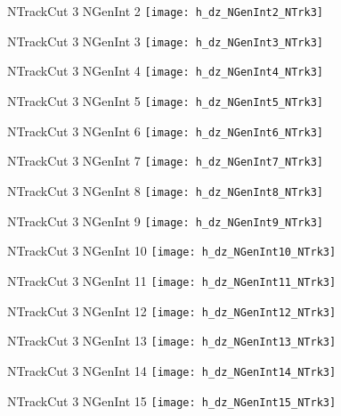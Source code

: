 \documentclass[8pt]{beamer}
\begin{document}
\begin{frame}
\center
\large{NTrackCut 3 NGenInt 2}
\texttt{[image: h\_dz\_NGenInt2\_NTrk3]}
\end{frame}
\begin{frame}
\center
\large{NTrackCut 3 NGenInt 3}
\texttt{[image: h\_dz\_NGenInt3\_NTrk3]}
\end{frame}
\begin{frame}
\center
\large{NTrackCut 3 NGenInt 4}
\texttt{[image: h\_dz\_NGenInt4\_NTrk3]}
\end{frame}
\begin{frame}
\center
\large{NTrackCut 3 NGenInt 5}
\texttt{[image: h\_dz\_NGenInt5\_NTrk3]}
\end{frame}
\begin{frame}
\center
\large{NTrackCut 3 NGenInt 6}
\texttt{[image: h\_dz\_NGenInt6\_NTrk3]}
\end{frame}
\begin{frame}
\center
\large{NTrackCut 3 NGenInt 7}
\texttt{[image: h\_dz\_NGenInt7\_NTrk3]}
\end{frame}
\begin{frame}
\center
\large{NTrackCut 3 NGenInt 8}
\texttt{[image: h\_dz\_NGenInt8\_NTrk3]}
\end{frame}
\begin{frame}
\center
\large{NTrackCut 3 NGenInt 9}
\texttt{[image: h\_dz\_NGenInt9\_NTrk3]}
\end{frame}
\begin{frame}
\center
\large{NTrackCut 3 NGenInt 10}
\texttt{[image: h\_dz\_NGenInt10\_NTrk3]}
\end{frame}
\begin{frame}
\center
\large{NTrackCut 3 NGenInt 11}
\texttt{[image: h\_dz\_NGenInt11\_NTrk3]}
\end{frame}
\begin{frame}
\center
\large{NTrackCut 3 NGenInt 12}
\texttt{[image: h\_dz\_NGenInt12\_NTrk3]}
\end{frame}
\begin{frame}
\center
\large{NTrackCut 3 NGenInt 13}
\texttt{[image: h\_dz\_NGenInt13\_NTrk3]}
\end{frame}
\begin{frame}
\center
\large{NTrackCut 3 NGenInt 14}
\texttt{[image: h\_dz\_NGenInt14\_NTrk3]}
\end{frame}
\begin{frame}
\center
\large{NTrackCut 3 NGenInt 15}
\texttt{[image: h\_dz\_NGenInt15\_NTrk3]}
\end{frame}
\end{document}
